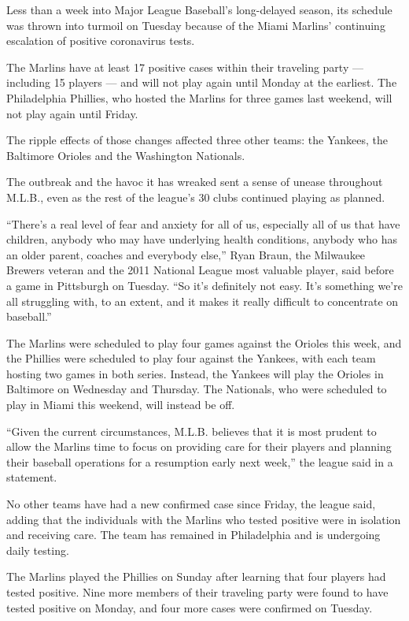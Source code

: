 Less than a week into Major League Baseball's long-delayed season, its
schedule was thrown into turmoil on Tuesday because of the Miami
Marlins' continuing escalation of positive coronavirus tests.

The Marlins have at least 17 positive cases within their traveling party
--- including 15 players --- and will not play again until Monday at the
earliest. The Philadelphia Phillies, who hosted the Marlins for three
games last weekend, will not play again until Friday.

The ripple effects of those changes affected three other teams: the
Yankees, the Baltimore Orioles and the Washington Nationals.

The outbreak and the havoc it has wreaked sent a sense of unease
throughout M.L.B., even as the rest of the league's 30 clubs continued
playing as planned.

``There's a real level of fear and anxiety for all of us, especially all
of us that have children, anybody who may have underlying health
conditions, anybody who has an older parent, coaches and everybody
else,'' Ryan Braun, the Milwaukee Brewers veteran and the 2011 National
League most valuable player, said before a game in Pittsburgh on
Tuesday. ``So it's definitely not easy. It's something we're all
struggling with, to an extent, and it makes it really difficult to
concentrate on baseball.''

The Marlins were scheduled to play four games against the Orioles this
week, and the Phillies were scheduled to play four against the Yankees,
with each team hosting two games in both series. Instead, the Yankees
will play the Orioles in Baltimore on Wednesday and Thursday. The
Nationals, who were scheduled to play in Miami this weekend, will
instead be off.

``Given the current circumstances, M.L.B. believes that it is most
prudent to allow the Marlins time to focus on providing care for their
players and planning their baseball operations for a resumption early
next week,'' the league said in a statement.

No other teams have had a new confirmed case since Friday, the league
said, adding that the individuals with the Marlins who tested positive
were in isolation and receiving care. The team has remained in
Philadelphia and is undergoing daily testing.

The Marlins played the Phillies on Sunday after learning that four
players had tested positive. Nine more members of their traveling party
were found to have tested positive on Monday, and four more cases were
confirmed on Tuesday.

